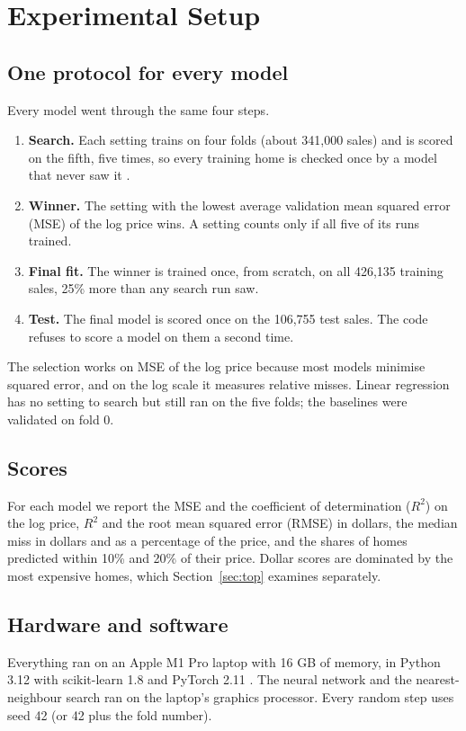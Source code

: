 \documentclass[sigconf,nonacm,10pt]{acmart}
\begin{document}
\section{Experimental Setup}
\label{sec:setup}

\subsection{One protocol for every model}
Every model went through the same four steps.
\begin{enumerate}
\item \textbf{Search.} Each setting trains on four folds (about 341,000 sales) and is scored on the fifth, five times, so every training home is checked once by a model that never saw it \cite{kohavi1995}.
\item \textbf{Winner.} The setting with the lowest average validation mean squared error (MSE) of the log price wins. A setting counts only if all five of its runs trained.
\item \textbf{Final fit.} The winner is trained once, from scratch, on all 426,135 training sales, 25\% more than any search run saw.
\item \textbf{Test.} The final model is scored once on the 106,755 test sales. The code refuses to score a model on them a second time.
\end{enumerate}
The selection works on MSE of the log price because most models minimise squared error, and on the log scale it measures relative misses. Linear regression has no setting to search but still ran on the five folds; the baselines were validated on fold 0.

\subsection{Scores}
For each model we report the MSE and the coefficient of determination ($R^2$) on the log price, $R^2$ and the root mean squared error (RMSE) in dollars, the median miss in dollars and as a percentage of the price, and the shares of homes predicted within 10\% and 20\% of their price. Dollar scores are dominated by the most expensive homes, which Section~\ref{sec:top} examines separately.

\subsection{Hardware and software}
Everything ran on an Apple M1 Pro laptop with 16 GB of memory, in Python 3.12 with scikit-learn 1.8 \cite{pedregosa2011} and PyTorch 2.11 \cite{paszke2019}. The neural network and the nearest-neighbour search ran on the laptop's graphics processor. Every random step uses seed 42 (or 42 plus the fold number).
\end{document}
